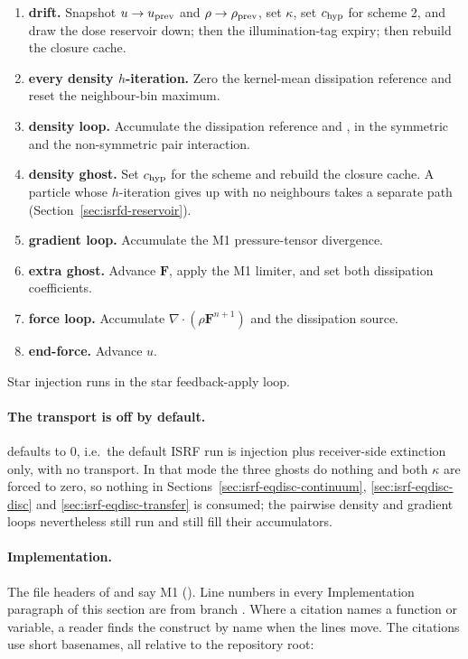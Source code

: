 \begin{enumerate}
  \item \textbf{drift.} Snapshot $u \to u_{\rm prev}$ and
    $\rho \to \rho_{\rm prev}$, set $\kappa$, set $c_{\rm hyp}$ for scheme
    2, and draw the dose reservoir down; then the illumination-tag
    expiry; then rebuild the closure cache.
  \item \textbf{every density $h$-iteration.} Zero the kernel-mean dissipation
    reference and reset the neighbour-bin maximum.
  \item \textbf{density loop.} Accumulate the dissipation reference and
    , in the symmetric and the non-symmetric pair
    interaction.
  \item \textbf{density ghost.} Set $c_{\rm hyp}$ for the 
    scheme and rebuild the closure cache. A particle whose $h$-iteration gives
    up with no neighbours takes a separate path
    (Section~\ref{sec:isrfd-reservoir}).
  \item \textbf{gradient loop.} Accumulate the M1 pressure-tensor divergence.
  \item \textbf{extra ghost.} Advance $\boldsymbol{F}$, apply the M1
    limiter, and set both dissipation coefficients.
  \item \textbf{force loop.} Accumulate
    $\nabla\!\cdot\!(\rho\boldsymbol{F}^{n+1})$ and the dissipation source.
  \item \textbf{end-force.} Advance $u$.
\end{enumerate}

Star injection runs in the star feedback-apply loop.

\paragraph{The transport is off by default.}
 defaults to 0, i.e.\ the default ISRF run is
injection plus receiver-side extinction only, with no transport. In that mode the
three ghosts do nothing and both $\kappa$ are forced to zero, so nothing in
Sections~\ref{sec:isrf-eqdisc-continuum}, \ref{sec:isrf-eqdisc-disc} and
\ref{sec:isrf-eqdisc-transfer} is consumed; the pairwise density and gradient
loops nevertheless still run and still fill their accumulators.

\paragraph{Implementation.} The file headers of  and
 say M1 ().
Line numbers in every Implementation paragraph of this section are from branch
. Where a citation names a function or variable, a
reader finds the construct by name when the lines move. The citations use short
basenames, all relative to the repository root:

